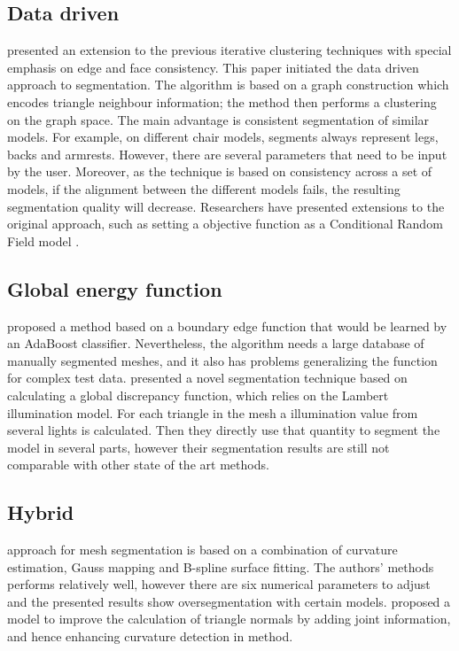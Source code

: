 \subsection{Data driven}

\cite{Golovinskiy2009} presented an extension to the previous iterative clustering techniques with special emphasis on edge and face consistency.
This paper initiated the data driven approach to segmentation.
The algorithm is based on a graph construction which encodes triangle neighbour information; the method then performs a clustering on the graph space.
The main advantage is consistent segmentation of similar models.
For example, on different chair models, segments always represent legs, backs and armrests. 
However, there are several parameters that need to be input by the user.
Moreover, as the technique is based on consistency across a set of models, if the alignment between the different models fails, the resulting segmentation quality will decrease.
Researchers have presented extensions to the original \cite{Golovinskiy2009} approach, such as setting a objective function as a Conditional Random Field model \cite{Kalogerakis2010}.

\subsection{Global energy function}

\cite{Benhabiles2011} proposed a method based on a boundary edge function that would be learned by an AdaBoost classifier.
Nevertheless, the algorithm needs a large database of manually segmented meshes, and it also has problems generalizing the function for complex test data.
\cite{DeCastro2014} presented a novel segmentation technique based on calculating a global discrepancy function, which relies on the Lambert illumination model.
For each triangle in the mesh a illumination value from several lights is calculated.
Then they directly use that quantity to segment the model in several parts, however their segmentation results are still not comparable with other state of the art methods.

\subsection{Hybrid}

\cite{Wang2011} approach for mesh segmentation is based on a combination of curvature estimation, Gauss mapping and B-spline surface fitting.
The authors' methods performs relatively well, however there are six numerical parameters to adjust and the presented results show oversegmentation with certain models.
\cite{Yang2014} proposed a model to improve the calculation of triangle normals by adding joint information, and hence enhancing curvature detection in \cite{Wang2011} method.

